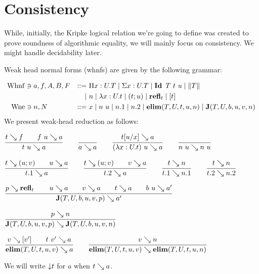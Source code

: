 \documentclass[a4paper,english]{lipics-utf8x}
\begin{document}
  \section{Consistency}

  While, initially, the Kripke logical relation we're going to define was
  created to prove soundness of algorithmic equality, we will mainly focus
  on consistency. We might handle decidability later.


  Weak head normal forms (whnfs) are given by the following grammar:

  \begin{align*}
    \operatorname{Whnf} &\ni a,f,A,B,F &::=~& \Pi x:U.T \mid \Sigma x:U.T \mid \operatorname{\mathbf{Id}~} T\ t\ u
                           \mid \|T\| \\
        &&\mid~& n \mid \lambda x:U.t \mid (t;u) \mid \operatorname{\mathbf{refl}}_t \mid [t] \\
    \operatorname{Wne}  &\ni n,N &::=~& x \mid n~u \mid n.1 \mid n.2 \mid \operatorname{\mathbf{elim}}(T,U,t,u,n)
                           \mid \operatorname{\mathbf{J}} (T,U,b,u,v,n)
  \end{align*}
  We present weak-head reduction as follows:

  \begin{center}
  \(
    \ru{t \rew f \qquad
        f~u \rew a
      }{t~u \rew a}
    \qquad
    \ru{}{a \rew a}
    \qquad
    \ru{t[u/x] \rew a
      }{(\lambda x:U.t)~u \rew a}
    \qquad
    \ru{}{n~u \rew n~u}
  \)
  \end{center}

  \begin{center}
  \(
    \ru{t \rew (u;v) \qquad
        u \rew a
      }{t.1 \rew a}
    \qquad
    \ru{t \rew (u;v) \qquad
        v \rew a
      }{t.2 \rew a}
    \qquad
    \ru{t \rew n
      }{t.1 \rew n.1}
    \qquad
    \ru{t \rew n
      }{t.2 \rew n.2}
  \)
  \end{center}

  \begin{center}
  \(
    \ru{p \rew \refl_t \qquad
        u \rew a \qquad
        v \rew a \qquad
        t \rew a \qquad
        b\ u \rew a'
      }{\J (T,U,b,u,v,p) \rew a'}
  \)
  \end{center}

  \begin{center}
  \(
    \ru{p \rew n
      }{\J (T,U,b,u,v,p) \rew \J (T,U,b,u,v,n)}
  \)
  \end{center}

  \begin{center}
  \(
    \ru{v \rew [v'] \qquad
        t\ v' \rew a
      }{\elim(T,U,t,u,v) \rew a}
    \qquad
    \ru{v \rew n
      }{\elim(T,U,t,u,v) \rew \elim(T,U,t,u,n)}
  \)
  \end{center}
  We will write ${\downarrow} t$ for $a$ when $t \searrow a$.
\end{document}
